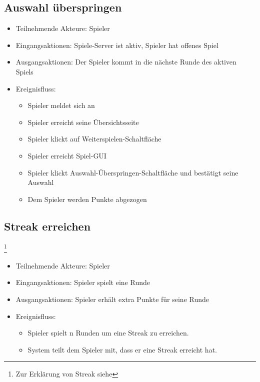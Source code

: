 \documentclass[a4paper]{scrreprt}
\begin{document}
	\subsection{Auswahl überspringen}
	\begin{itemize}
		\item Teilnehmende Akteure: \Gls{Spieler}
		\item Eingangsaktionen: Spiele-Server ist aktiv, Spieler hat offenes Spiel
        \item Ausgangsaktionen: Der Spieler kommt in die nächste Runde des aktiven Spiels
		\item Ereignisfluss:
		\begin{itemize}
			\item Spieler meldet sich an
			\item Spieler erreicht seine Übersichtsseite
			\item Spieler klickt auf Weiterspielen-Schaltfläche
			\item Spieler erreicht Spiel-GUI
			\item Spieler klickt Auswahl-Überspringen-Schaltfläche und bestätigt seine Auswahl
            \item Dem Spieler werden Punkte abgezogen
		\end{itemize}
	\end{itemize}
     
    \subsection{Streak erreichen}\footnote{Zur Erklärung von Streak siehe }
    \begin{itemize}
        \item Teilnehmende Akteure: \Gls{Spieler}
        \item Eingangsaktionen: Spieler spielt eine Runde
        \item Ausgangsaktionen: Spieler erhält extra Punkte für seine Runde
        \item Ereignisfluss:
        \begin{itemize}
            \item Spieler spielt n Runden um eine Streak zu erreichen. 
            \item System teilt dem Spieler mit, dass er eine Streak erreicht hat.
        \end{itemize}
    \end{itemize}
    
\end{document}
